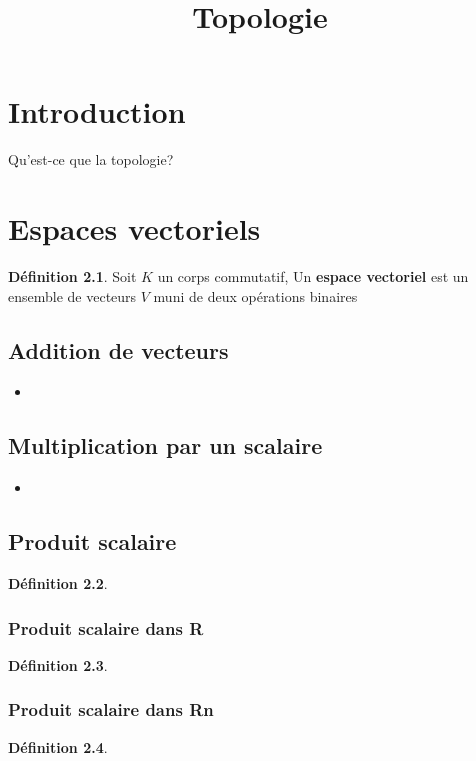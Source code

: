 \documentclass[12pt]{book}
\title{Topologie}
\newcommand\todo[1]{\phantom{#1}}
\theoremstyle{definition}
\newtheorem{definition}{Définition}[section]
\begin{document}
\chapter{Introduction}
Qu'est-ce que la topologie?


\chapter{Espaces vectoriels}
\todo{Complete}
\begin{definition}
    \label{def:espace_vectoriel} 
    Soit $K$ un corps commutatif, Un \textbf{espace vectoriel} est un ensemble de vecteurs $V$ muni de deux opérations binaires
\end{definition}

\section{Addition de vecteurs}
\begin{itemize}
    \item 
\end{itemize}

\section{Multiplication par un scalaire}
\begin{itemize}
    \item 
\end{itemize}

\section{Produit scalaire}
\begin{definition}
    \label{def:produit_scalaire}
\end{definition}
\subsection{Produit scalaire dans R}
\begin{definition}
    \label{def:produit_scalaire_r}
\end{definition}
\subsection{Produit scalaire dans Rn}
\begin{definition}
    \label{def:produit_scalaire_rn}
\end{definition}
\end{document}
